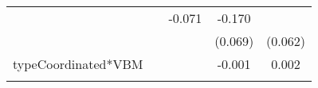 \documentclass[12pt,twoside]{reedthesis}
\begin{document}
\begin{longtable}[]{@{}ccccc@{}}
\begin{minipage}[t]{0.12\columnwidth}
  \strut
  \end{minipage} & \begin{minipage}[t]{0.12\columnwidth}\centering\strut
  \strut
  \end{minipage} & \begin{minipage}[t]{0.12\columnwidth}\centering\strut
  -0.071\strut
  \end{minipage} & \begin{minipage}[t]{0.12\columnwidth}\centering\strut
  -0.170\strut
  \end{minipage}\tabularnewline
  \begin{minipage}[t]{0.26\columnwidth}\centering\strut
  \strut
  \end{minipage} & \begin{minipage}[t]{0.12\columnwidth}\centering\strut
  \strut
  \end{minipage} & \begin{minipage}[t]{0.12\columnwidth}\centering\strut
  \strut
  \end{minipage} & \begin{minipage}[t]{0.12\columnwidth}\centering\strut
  (0.069)\strut
  \end{minipage} & \begin{minipage}[t]{0.12\columnwidth}\centering\strut
  (0.062)\strut
  \end{minipage}\tabularnewline
  \begin{minipage}[t]{0.26\columnwidth}\centering\strut
  typeCoordinated*VBM\strut
  \end{minipage} & \begin{minipage}[t]{0.12\columnwidth}\centering\strut
  \strut
  \end{minipage} & \begin{minipage}[t]{0.12\columnwidth}\centering\strut
  \strut
  \end{minipage} & \begin{minipage}[t]{0.12\columnwidth}\centering\strut
  -0.001\strut
  \end{minipage} & \begin{minipage}[t]{0.12\columnwidth}\centering\strut
  0.002\strut
  \end{minipage}\tabularnewline
  \begin{minipage}[t]{0.26\columnwidth}\centering\strut
  \strut
  \end{minipage} & \begin{minipage}[t]{0.12\columnwidth}\centering\strut
  \strut
  \end{minipage} & \begin{minipage}[t]{0.12\columnwidth}\centering\strut

\end{minipage}
\end{longtable}
\end{document}
